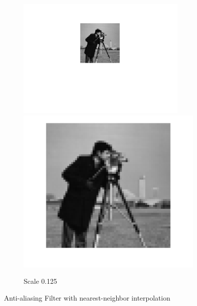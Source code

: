 \documentclass{article}
\begin{document}
\begin{figure}[h!]
\begin{subfigure}[t]{0.3\textwidth}
		\includegraphics[width=\linewidth]{./output_images/DOWN_anti-alias_nearest_scale_0_125000.png}
		\includegraphics[width=\linewidth]{./output_images/UP_anti-alias_nearest_scale_0_125000.png}
		\caption{Scale 0.125}
	\end{subfigure}
	\caption{Anti-aliasing Filter with nearest-neighbor interpolation}
\end{figure}

\pagebreak
\end{document}

